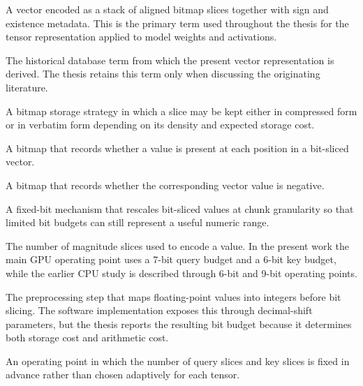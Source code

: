 \begin{description}
    \setlength{\itemsep}{0.5cm}

    \item[\textbf{Bit-Sliced Vector (BSV)}]
    A vector encoded as a stack of aligned bitmap slices together with sign and existence metadata. This is the primary term used throughout the thesis for the tensor representation applied to model weights and activations.

    \item[\textbf{Bit-Sliced Indexing (BSI)}]
    The historical database term from which the present vector representation is derived. The thesis retains this term only when discussing the originating literature.

    \item[\textbf{Hybrid Bitmap}]
    A bitmap storage strategy in which a slice may be kept either in compressed form or in verbatim form depending on its density and expected storage cost.

    \item[\textbf{Existence Bitmap}]
    A bitmap that records whether a value is present at each position in a bit-sliced vector.

    \item[\textbf{Sign Bitmap}]
    A bitmap that records whether the corresponding vector value is negative.

    \item[\textbf{Chunk-Local Rescaling}]
    A fixed-bit mechanism that rescales bit-sliced values at chunk granularity so that limited bit budgets can still represent a useful numeric range.

    \item[\textbf{Bit Budget}]
    The number of magnitude slices used to encode a value. In the present work the main GPU operating point uses a 7-bit query budget and a 6-bit key budget, while the earlier CPU study is described through 6-bit and 9-bit operating points.

    \item[\textbf{Fixed-Point Mapping}]
    The preprocessing step that maps floating-point values into integers before bit slicing. The software implementation exposes this through decimal-shift parameters, but the thesis reports the resulting bit budget because it determines both storage cost and arithmetic cost.

    \item[\textbf{Fixed Bit-Budget Regime}]
    An operating point in which the number of query slices and key slices is fixed in advance rather than chosen adaptively for each tensor.


\end{description}
